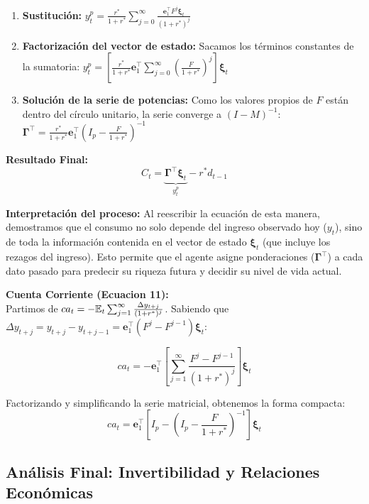 \begin{enumerate}
    \item \textbf{Sustitución:} 
    $y_t^p = \frac{r^*}{1+r^*} \sum_{j=0}^{\infty} \frac{\mathbf{e}_1^\top F^j \bm{\xi}_t}{(1+r^*)^j}$
    \item \textbf{Factorización del vector de estado:} Sacamos los términos constantes de la sumatoria:
    $y_t^p = \left[ \frac{r^*}{1+r^*} \mathbf{e}_1^\top \sum_{j=0}^{\infty} \left( \frac{F}{1+r^*} \right)^j \right] \bm{\xi}_t$
    \item \textbf{Solución de la serie de potencias:} Como los valores propios de $F$ están dentro del círculo unitario, la serie converge a $(I - M)^{-1}$:
    $\bm{\Gamma}^\top = \frac{r^*}{1+r^*} \mathbf{e}_1^\top \left( I_p - \frac{F}{1+r^*} \right)^{-1}$
\end{enumerate}

\textbf{Resultado Final:}
\begin{equation}
    C_t = \underbrace{\bm{\Gamma}^\top \bm{\xi}_t}_{y_t^p} - r^* d_{t-1}
\end{equation}

\textbf{Interpretación del proceso:} 
Al reescribir la ecuación de esta manera, demostramos que el consumo no solo depende del ingreso observado hoy ($y_t$), sino de toda la información contenida en el vector de estado $\bm{\xi}_t$ (que incluye los rezagos del ingreso). Esto permite que el agente asigne ponderaciones ($\bm{\Gamma}^\top$) a cada dato pasado para predecir su riqueza futura y decidir su nivel de vida actual.

\textbf{Cuenta Corriente (Ecuacion 11):} \\
Partimos de $ca_t = -\mathbb{E}_t \sum_{j=1}^{\infty} \frac{\Delta y_{t+j}}{(1+r^*)^j}$. Sabiendo que $\Delta y_{t+j} = y_{t+j} - y_{t+j-1} = \mathbf{e}_1^\top (F^j - F^{j-1}) \bm{\xi}_t$:

\begin{equation}
    ca_t = -\mathbf{e}_1^\top \left[ \sum_{j=1}^{\infty} \frac{F^j - F^{j-1}}{(1+r^*)^j} \right] \bm{\xi}_t
\end{equation}

Factorizando y simplificando la serie matricial, obtenemos la forma compacta:
\begin{equation}
    ca_t = \mathbf{e}_1^\top \left[ I_p - \left( I_p - \frac{F}{1+r^*} \right)^{-1} \right] \bm{\xi}_t
\end{equation}

\subsection*{Análisis Final: Invertibilidad y Relaciones Económicas}

